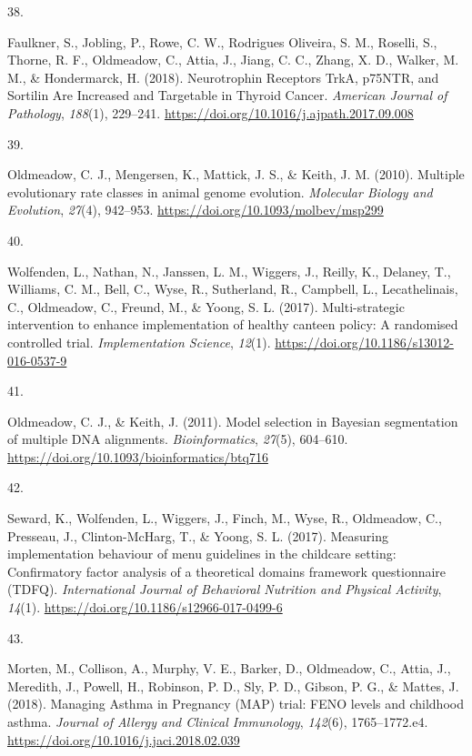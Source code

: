 \documentclass[11pt, a4paper]{awesome-cv}
\newlength{\csllabelwidth}
\newcommand{\CSLLeftMargin}[1]{\parbox[t]{\csllabelwidth}{#1}}
\newcommand{\CSLRightInline}[1]{\parbox[t]{\linewidth - \csllabelwidth}{#1}}
\begin{document}
\leavevmode\hypertarget{ref-faulkner_neurotrophin_2018}{}%
\CSLLeftMargin{38. }
\CSLRightInline{Faulkner, S., Jobling, P., Rowe, C. W., Rodrigues
Oliveira, S. M., Roselli, S., Thorne, R. F., Oldmeadow, C., Attia, J.,
Jiang, C. C., Zhang, X. D., Walker, M. M., \& Hondermarck, H. (2018).
Neurotrophin Receptors TrkA, p75NTR, and Sortilin Are Increased and
Targetable in Thyroid Cancer. \emph{American Journal of Pathology},
\emph{188}(1), 229--241.
\url{https://doi.org/10.1016/j.ajpath.2017.09.008}}

\leavevmode\hypertarget{ref-oldmeadow_multiple_2010}{}%
\CSLLeftMargin{39. }
\CSLRightInline{Oldmeadow, C. J., Mengersen, K., Mattick, J. S., \&
Keith, J. M. (2010). Multiple evolutionary rate classes in animal genome
evolution. \emph{Molecular Biology and Evolution}, \emph{27}(4),
942--953. \url{https://doi.org/10.1093/molbev/msp299}}

\leavevmode\hypertarget{ref-wolfenden_multi-strategic_2017}{}%
\CSLLeftMargin{40. }
\CSLRightInline{Wolfenden, L., Nathan, N., Janssen, L. M., Wiggers, J.,
Reilly, K., Delaney, T., Williams, C. M., Bell, C., Wyse, R.,
Sutherland, R., Campbell, L., Lecathelinais, C., Oldmeadow, C., Freund,
M., \& Yoong, S. L. (2017). Multi-strategic intervention to enhance
implementation of healthy canteen policy: A randomised controlled trial.
\emph{Implementation Science}, \emph{12}(1).
\url{https://doi.org/10.1186/s13012-016-0537-9}}

\leavevmode\hypertarget{ref-oldmeadow_model_2011}{}%
\CSLLeftMargin{41. }
\CSLRightInline{Oldmeadow, C. J., \& Keith, J. (2011). Model selection
in Bayesian segmentation of multiple DNA alignments.
\emph{Bioinformatics}, \emph{27}(5), 604--610.
\url{https://doi.org/10.1093/bioinformatics/btq716}}

\leavevmode\hypertarget{ref-seward_measuring_2017}{}%
\CSLLeftMargin{42. }
\CSLRightInline{Seward, K., Wolfenden, L., Wiggers, J., Finch, M., Wyse,
R., Oldmeadow, C., Presseau, J., Clinton-McHarg, T., \& Yoong, S. L.
(2017). Measuring implementation behaviour of menu guidelines in the
childcare setting: Confirmatory factor analysis of a theoretical domains
framework questionnaire (TDFQ). \emph{International Journal of
Behavioral Nutrition and Physical Activity}, \emph{14}(1).
\url{https://doi.org/10.1186/s12966-017-0499-6}}

\leavevmode\hypertarget{ref-morten_managing_2018}{}%
\CSLLeftMargin{43. }
\CSLRightInline{Morten, M., Collison, A., Murphy, V. E., Barker, D.,
Oldmeadow, C., Attia, J., Meredith, J., Powell, H., Robinson, P. D.,
Sly, P. D., Gibson, P. G., \& Mattes, J. (2018). Managing Asthma in
Pregnancy (MAP) trial: FENO levels and childhood asthma. \emph{Journal
of Allergy and Clinical Immunology}, \emph{142}(6), 1765--1772.e4.
\url{https://doi.org/10.1016/j.jaci.2018.02.039}}
\end{document}
